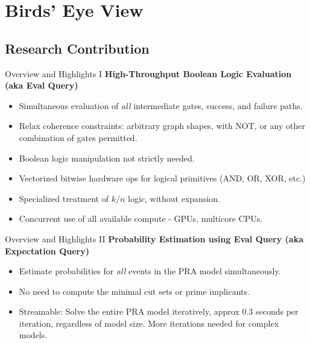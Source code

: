 \section{Birds' Eye View}
\subsection{Research Contribution}
\begin{frame}{Overview and Highlights I}
\textbf{High-Throughput Boolean Logic Evaluation (aka Eval Query)}
  \begin{itemize}
    \item{Simultaneous evaluation of \emph{all} intermediate gates, success, and failure paths.}
    \item{Relax coherence constraints: arbitrary graph shapes, with NOT, or any other combination of gates permitted.}
    \item{Boolean logic manipulation not strictly needed.}
    \item{Vectorized bitwise hardware ops for logical primitives (AND, OR, XOR, etc.)}
    \item{Specialized treatment of \(k/n\) logic, without expansion.}
    \item{Concurrent use of all available compute - GPUs, multicore CPUs.}
  \end{itemize}
\end{frame}

\begin{frame}{Overview and Highlights II}
\textbf{Probability Estimation using Eval Query (aka Expectation Query)}
  \begin{itemize}
    \item{Estimate probabilities for \emph{all} events in the PRA model simultaneously.}
    \item{No need to compute the minimal cut sets or prime implicants.}
    \item{Streamable: Solve the entire PRA model iteratively, approx 0.3 seconds per
iteration, regardless of model size. More iterations needed for complex
models.}
  \end{itemize}
\end{frame}